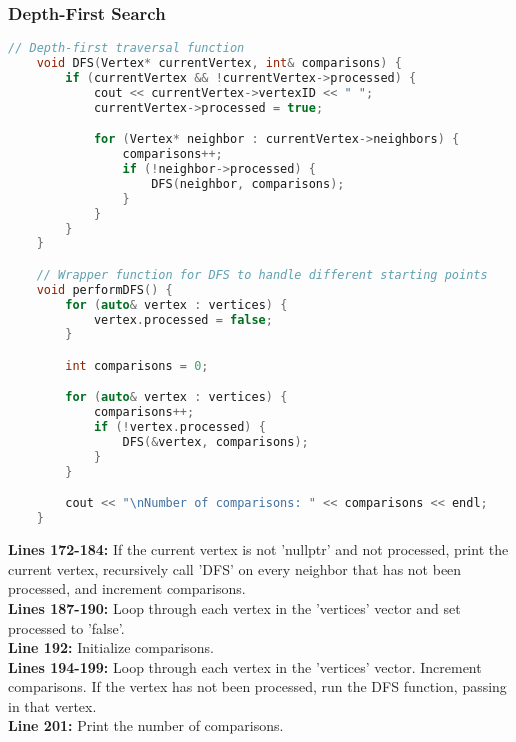 \documentclass[letterpaper, 10pt,DIV=13]{scrartcl}
\numberwithin{equation}{section} %
\numberwithin{figure}{section} %
\numberwithin{table}{section} %
\begin{document}
\subsubsection{Depth-First Search}
\begin{linenumbers}
\begin{lstlisting}[language=C++, caption={Depth-First Search}, label={code:example}]
    // Depth-first traversal function
    void DFS(Vertex* currentVertex, int& comparisons) {
        if (currentVertex && !currentVertex->processed) {
            cout << currentVertex->vertexID << " ";
            currentVertex->processed = true;

            for (Vertex* neighbor : currentVertex->neighbors) {
                comparisons++;
                if (!neighbor->processed) {
                    DFS(neighbor, comparisons);
                }
            }
        }
    }

    // Wrapper function for DFS to handle different starting points
    void performDFS() {
        for (auto& vertex : vertices) {
            vertex.processed = false;
        }

        int comparisons = 0;

        for (auto& vertex : vertices) {
            comparisons++;
            if (!vertex.processed) {
                DFS(&vertex, comparisons);
            }
        }

        cout << "\nNumber of comparisons: " << comparisons << endl;
    }

\end{lstlisting}
\end{linenumbers}
\nolinenumbers

\textbf{Lines 172-184:} If the current vertex is not 'nullptr' and not processed, print the current vertex, recursively call 'DFS' on every neighbor that has not been processed, and increment comparisons. \\
\textbf{Lines 187-190:} Loop through each vertex in the 'vertices' vector and set processed to 'false'. \\
\textbf{Line 192:} Initialize comparisons. \\
\textbf{Lines 194-199:} Loop through each vertex in the 'vertices' vector. Increment comparisons. If the vertex has not been processed, run the DFS function, passing in that vertex. \\
\textbf{Line 201:} Print the number of comparisons. \\
\end{document}
